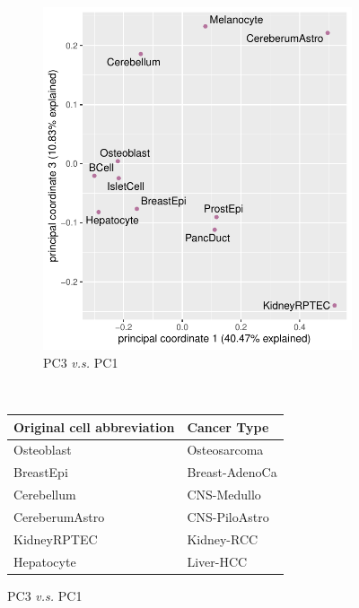 \begin{figure}[ht!]
\begin{minipage}[c]{\textwidth}
\begin{subfigure}{.5\textwidth}
    \includegraphics[scale=0.7]{graphics/encode_pca_1_3.pdf}
    \caption{PC3 \textit{v.s.} PC1}
    \end{subfigure} \\
  \end{minipage}\hfill
  \vspace{1cm}
  
  \begin{minipage}[c]{\textwidth}
    \centering
    \begin{tabulary}{\textwidth}{ ll }
    \toprule
    \textbf{Original cell abbreviation} & \bf{Cancer Type}  \\
    \toprule
    Osteoblast & Osteosarcoma \\
    
    BreastEpi & Breast-AdenoCa \\
    
    Cerebellum &  CNS-Medullo  \\
    
    CereberumAstro & CNS-PiloAstro \\
    
    KidneyRPTEC & Kidney-RCC \\
    
    Hepatocyte & Liver-HCC \\
    

\end{tabulary}
\end{minipage}
\end{figure}
